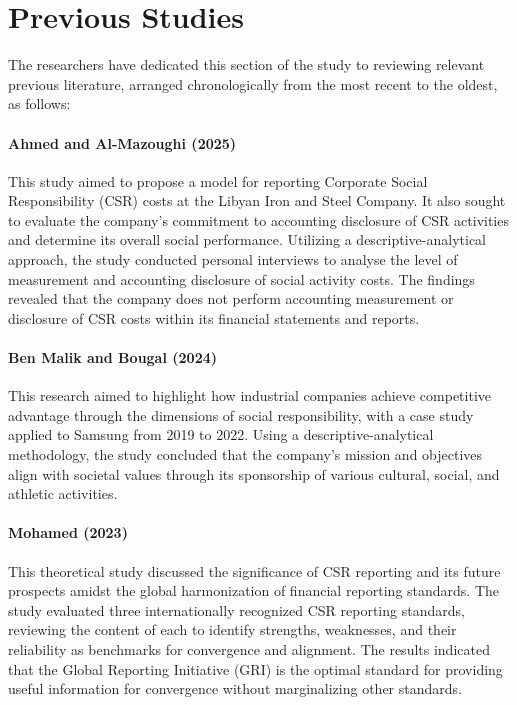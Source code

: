 \documentclass[10pt]{NSP1}
\begin{document}
	\section{Previous Studies}
	
	The researchers have dedicated this section of the study to reviewing relevant previous literature, arranged chronologically from the most recent to the oldest, as follows:
	
	\paragraph{Ahmed and Al-Mazoughi (2025) \cite{Ahmed2025}} This study aimed to propose a model for reporting Corporate Social Responsibility (CSR) costs at the Libyan Iron and Steel Company. It also sought to evaluate the company's commitment to accounting disclosure of CSR activities and determine its overall social performance. Utilizing a descriptive-analytical approach, the study conducted personal interviews to analyse the level of measurement and accounting disclosure of social activity costs. The findings revealed that the company does not perform accounting measurement or disclosure of CSR costs within its financial statements and reports.
	
	\paragraph{Ben Malik and Bougal (2024) \cite{BenMalik2024}} This research aimed to highlight how industrial companies achieve competitive advantage through the dimensions of social responsibility, with a case study applied to Samsung from 2019 to 2022. Using a descriptive-analytical methodology, the study concluded that the company's mission and objectives align with societal values through its sponsorship of various cultural, social, and athletic activities.
	
	\paragraph{Mohamed (2023) \cite{Mohamed2023}} This theoretical study discussed the significance of CSR reporting and its future prospects amidst the global harmonization of financial reporting standards. The study evaluated three internationally recognized CSR reporting standards, reviewing the content of each to identify strengths, weaknesses, and their reliability as benchmarks for convergence and alignment. The results indicated that the Global Reporting Initiative (GRI) is the optimal standard for providing useful information for convergence without marginalizing other standards.
	
\end{document}
